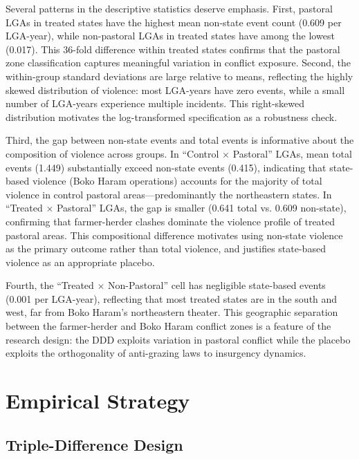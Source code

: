 \documentclass[12pt]{article}
\begin{document}
Several patterns in the descriptive statistics deserve emphasis. First, pastoral LGAs in treated states have the highest mean non-state event count (0.609 per LGA-year), while non-pastoral LGAs in treated states have among the lowest (0.017). This 36-fold difference within treated states confirms that the pastoral zone classification captures meaningful variation in conflict exposure. Second, the within-group standard deviations are large relative to means, reflecting the highly skewed distribution of violence: most LGA-years have zero events, while a small number of LGA-years experience multiple incidents. This right-skewed distribution motivates the log-transformed specification as a robustness check.

Third, the gap between non-state events and total events is informative about the composition of violence across groups. In ``Control $\times$ Pastoral'' LGAs, mean total events (1.449) substantially exceed non-state events (0.415), indicating that state-based violence (Boko Haram operations) accounts for the majority of total violence in control pastoral areas---predominantly the northeastern states. In ``Treated $\times$ Pastoral'' LGAs, the gap is smaller (0.641 total vs. 0.609 non-state), confirming that farmer-herder clashes dominate the violence profile of treated pastoral areas. This compositional difference motivates using non-state violence as the primary outcome rather than total violence, and justifies state-based violence as an appropriate placebo.

Fourth, the ``Treated $\times$ Non-Pastoral'' cell has negligible state-based events (0.001 per LGA-year), reflecting that most treated states are in the south and west, far from Boko Haram's northeastern theater. This geographic separation between the farmer-herder and Boko Haram conflict zones is a feature of the research design: the DDD exploits variation in pastoral conflict while the placebo exploits the orthogonality of anti-grazing laws to insurgency dynamics.




\section{Empirical Strategy}

\subsection{Triple-Difference Design}
\end{document}
